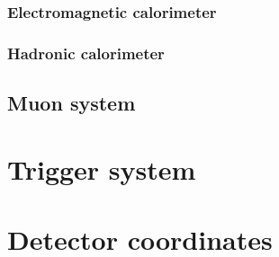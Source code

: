 \subsubsection{Electromagnetic calorimeter}
\label{sec:ECAL}


\subsubsection{Hadronic calorimeter}
\label{sec:HCAL}


\subsection{Muon system}
\label{sec:MuonSystem}


\section{Trigger system}
\label{sec:TriggerSystem}


\section{Detector coordinates}
\label{sec:DetectorCoordinates}